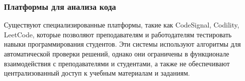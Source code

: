 \subsubsection*{Платформы для анализа кода}
Существуют специализированные платформы, такие как CodeSignal, Codility, LeetCode, которые позволяют преподавателям и работодателям тестировать навыки программирования студентов. Эти системы используют алгоритмы для автоматической проверки решений, однако они ограничены в функционале взаимодействия с преподавателями и студентами, а также не обеспечивают централизованный доступ к учебным материалам и заданиям.
